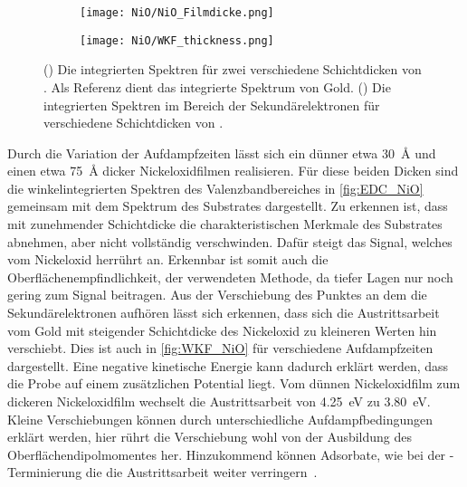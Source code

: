         \begin{figure}
            \centering
            \begin{subfigure}[t]{0.48\textwidth}
                \centering
                \texttt{[image: NiO/NiO\_Filmdicke.png]}
                \subcaption{}
                \label{fig:EDC_NiO}
            \end{subfigure}
            \begin{subfigure}[t]{0.48\textwidth}
                \centering
                \texttt{[image: NiO/WKF\_thickness.png]}
                \caption{}
                \label{fig:WKF_NiO}
            \end{subfigure}
            \caption{() Die integrierten Spektren für zwei verschiedene Schichtdicken von . Als Referenz dient das integrierte Spektrum von Gold. 
            () Die integrierten Spektren im Bereich der Sekundärelektronen für verschiedene Schichtdicken von .}
        \end{figure}
        Durch die Variation der Aufdampfzeiten lässt sich ein dünner etwa \SI{30}{\angstrom} und einen etwa \SI{75}{\angstrom} dicker Nickeloxidfilmen realisieren.
        Für diese beiden Dicken sind die winkelintegrierten Spektren des Valenzbandbereiches in \autoref{fig:EDC_NiO} gemeinsam mit dem Spektrum des Substrates dargestellt.
        Zu erkennen ist, dass mit zunehmender Schichtdicke die charakteristischen Merkmale des Substrates abnehmen, aber nicht vollständig verschwinden.
        Dafür steigt das Signal, welches vom Nickeloxid herrührt an.
        Erkennbar ist somit auch die Oberflächenempfindlichkeit, der verwendeten Methode, da tiefer Lagen nur noch gering zum Signal beitragen.
        Aus der Verschiebung des Punktes an dem die Sekundärelektronen aufhören lässt sich erkennen, dass sich die Austrittsarbeit vom Gold mit steigender Schichtdicke des Nickeloxid zu kleineren Werten hin verschiebt.
        Dies ist auch in \autoref{fig:WKF_NiO} für verschiedene Aufdampfzeiten dargestellt.
        Eine negative kinetische Energie kann dadurch erklärt werden, dass die Probe auf einem zusätzlichen Potential liegt.
        Vom dünnen Nickeloxidfilm zum dickeren Nickeloxidfilm wechselt die Austrittsarbeit von \SI{4.25}{\electronvolt} zu \SI{3.80}{\electronvolt}.
        Kleine Verschiebungen können durch unterschiedliche Aufdampfbedingungen erklärt werden, hier rührt die Verschiebung wohl von der Ausbildung des Oberflächendipolmomentes her.
        Hinzukommend können Adsorbate, wie bei der -Terminierung die die Austrittsarbeit weiter verringern~\cite{NiO_40}.
